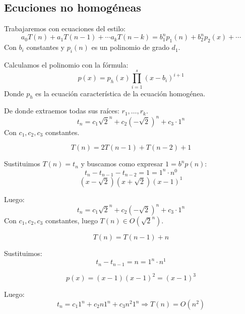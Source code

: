 \subsection{Ecuciones no homogéneas}
Trabajaremos con ecuaciones del estilo:
\begin{equation*}
    a_0T(n) +a_1T(n-1)+\cdots a_k T(n-k) = b_1^n p_1(n) + b_2^n p_2(x) + \cdots
\end{equation*}
Con $b_i$ constantes y 
$p_i(n)$ es un polinomio de grado $d_1$.

Calculamos el polinomio con la fórmula:
\begin{equation*}
    p(x) = p_h(x)\prod_{i=1}^{s} (x-b_i)^{i+1}
\end{equation*}
Donde $p_h$ es la ecuación característica de la ecuación homogénea.

De donde extraemos todas sus raíces: $r_1, \ldots, r_k$.
\begin{equation*}
    t_n = c_1 \sqrt{2}^n + c_2 (-\sqrt{2})^n + c_3 \cdot 1^n 
\end{equation*}
Con $c_1, c_2, c_3$ constantes.

\begin{ejemplo}[Fibonacci]
\begin{equation*}
    T(n) = 2T(n-1)+T(n-2)+1
\end{equation*}

Sustituimos $T(n) = t_n$ y buscamos como expresar $1 = b^n p(n)$:
\begin{equation*}
    t_n - t_{n-1} - t_{n-2} = 1 = 1^n \cdot n^0
\end{equation*}
\begin{equation*}
    \left(x-\sqrt{2}\right)\left(x+\sqrt{2}\right)\left(x-1\right)^1
\end{equation*}

Luego:
\begin{equation*}
    t_n = c_1 \sqrt{2}^n + c_2 (-\sqrt{2})^n + c_3 \cdot 1^n
\end{equation*}
Con $c_1, c_2, c_3$ constantes, luego $T(n) \in O(\sqrt{2}^n)$.
\end{ejemplo}

\begin{ejemplo}
\begin{equation*}
    T(n) = T(n-1) +n
\end{equation*}

Sustituimos:
\begin{equation*}
    t_n - t_{n-1} = n = 1^n \cdot n^1
\end{equation*}

\begin{equation*}
    p(x) = (x-1)(x-1)^2 = (x-1)^3
\end{equation*}

Luego:
\begin{equation*}
    t_n = c_1 1^n + c_2 n1^n + c_3 n^2 1^n \Rightarrow T(n) = O(n^2)
\end{equation*}
\end{ejemplo}

